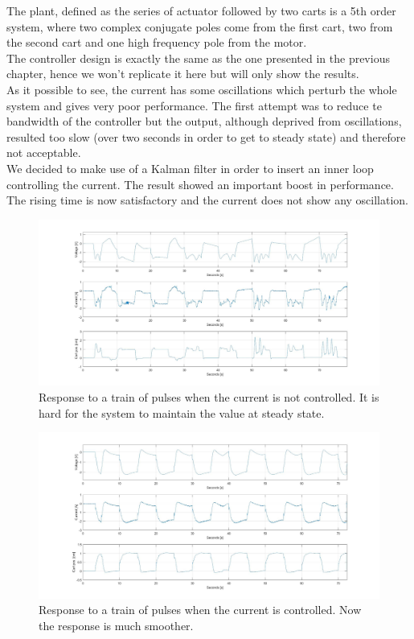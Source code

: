 The plant, defined as the series of actuator followed by two carts is a 5th order system, where two complex conjugate poles come from the first cart, two from the second cart and one high frequency pole from the motor.\\

The controller design is exactly the same as the one presented in the previous chapter, hence we won't replicate it here but will only show the results.\\

As it possible to see, the current has some oscillations which perturb the whole system and gives very poor performance. The first attempt was to reduce te bandwidth of the controller but the output, although deprived from oscillations, resulted too slow (over two seconds in order to get to steady state) and therefore not acceptable.\\

We decided to make use of a Kalman filter in order to insert an inner loop controlling the current. The result showed an important boost in performance. The rising time is now satisfactory and the current does not show any oscillation.\\

\begin{figure}[h]
	\setlength{\belowcaptionskip}{-10pt}
	\centering
	\includegraphics[width=0.9\linewidth]{img/hinf_nocurr}
	\caption{Response to a train of pulses when the current is not controlled. It is hard for the system to maintain the value at steady state.}
	\label{fig:hinfnocurr}
\end{figure}

\begin{figure}[h]
	\centering
	\includegraphics[width=0.9\linewidth]{img/hinf_curr}
	\caption{Response to a train of pulses when the current is controlled. Now the response is much smoother.}
	\label{fig:hinfnocurr}
\end{figure}

